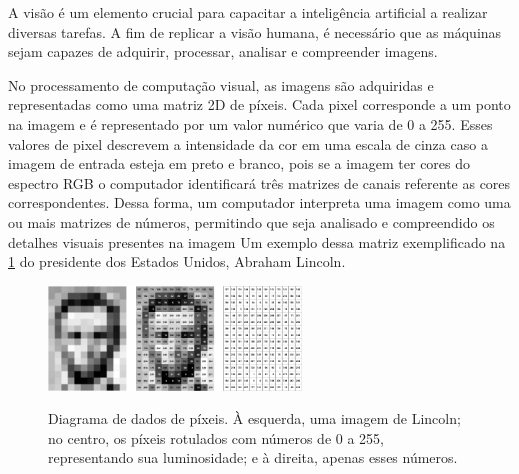 A visão é um elemento crucial para capacitar a inteligência artificial a realizar diversas tarefas. A fim de replicar a visão humana, é necessário que as máquinas sejam capazes de adquirir, processar, analisar e compreender imagens. \space\cite{como_funciona_visao_computacional}



No processamento de computação visual, as imagens são adquiridas e representadas como uma matriz 2D de píxeis. Cada pixel corresponde a um ponto na imagem e é representado por um valor numérico que varia de 0 a 255. Esses valores de pixel descrevem a intensidade da cor em uma escala de cinza caso a imagem de entrada esteja em preto e branco, pois se a imagem ter cores do espectro RGB o computador identificará três matrizes de canais referente as cores correspondentes. Dessa forma, um computador interpreta uma imagem como uma ou mais matrizes de números, permitindo que seja analisado e compreendido os detalhes visuais presentes na imagem Um exemplo dessa matriz exemplificado na \cref{fig:comp_vision} do presidente dos Estados Unidos, Abraham Lincoln\cite{mit_video}.

\begin{figure}[ht]
	\caption{Diagrama de dados de píxeis. À esquerda, uma imagem de Lincoln; no centro, os píxeis rotulados com números de 0 a 255, representando sua luminosidade; e à direita, apenas esses números.}
	\centering
	\includegraphics[width=0.6\textwidth]{figures/lincoln_pixel_values.png}
  \label{fig:comp_vision}
\end{figure}


